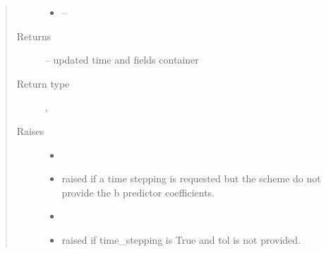 \documentclass[letterpaper,10pt,english]{sphinxmanual}
\begin{document}
\begin{fulllineitems}
\begin{fulllineitems}
\begin{quote}
\begin{description}
\begin{itemize}
\item {} 
 -- 

\end{itemize}

\item[{Returns}] \leavevmode
{} -- updated time and fields container

\item[{Return type}] \leavevmode
{\hyperref[\detokenize{triflow.core:triflow.core.simulation.Simulation.t}]{}}, {\hyperref[\detokenize{triflow.core:module-triflow.core.fields}]{}}

\item[{Raises}] \leavevmode\begin{itemize}
\item {} 

\item {} 
raised if a time stepping is requested but the scheme do not provide the b predictor coefficients.

\item {} 

\item {} 
raised if time\_stepping is True and tol is not provided.

\end{itemize}

\end{description}\end{quote}

\end{fulllineitems}


\end{fulllineitems}

\end{document}
